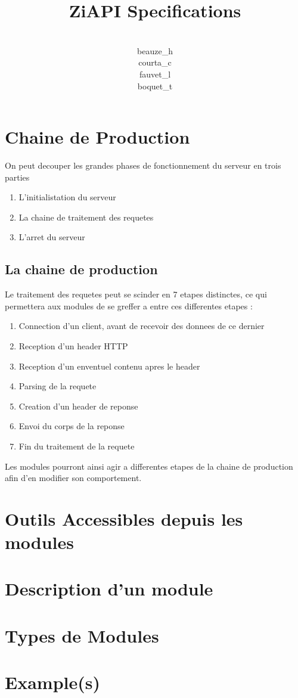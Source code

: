 \documentclass{report}
\title{ZiAPI Specifications}
\author{\\beauze\_h\\courta\_c\\fauvet\_l\\boquet\_t}
\begin{document}
  \maketitle
  \tableofcontents
  \chapter{Chaine de Production}
    On peut decouper les grandes phases de fonctionnement du serveur en trois parties

    \begin{enumerate}
    \item L'initialistation du serveur
    \item La chaine de traitement des requetes
    \item L'arret du serveur
    \end{enumerate}

    \section{La chaine de production}
        Le traitement des requetes peut se scinder en 7 etapes distinctes, ce qui permettera aux modules de se greffer a 
        entre ces differentes etapes :
        \begin{enumerate}
            \item Connection d'un client, avant de recevoir des donnees de ce dernier
            \item Reception d'un header HTTP
            \item Reception d'un enventuel contenu apres le header
            \item Parsing de la requete
            \item Creation d'un header de reponse
            \item Envoi du corps de la reponse
            \item Fin du traitement de la requete
        \end{enumerate}

        Les modules pourront ainsi agir a differentes etapes de la chaine de production afin d'en modifier son comportement.
  \chapter{Outils Accessibles depuis les modules}
  \chapter{Description d'un module}
  \chapter{Types de Modules}
  \chapter{Example(s)}
    
\end{document}
